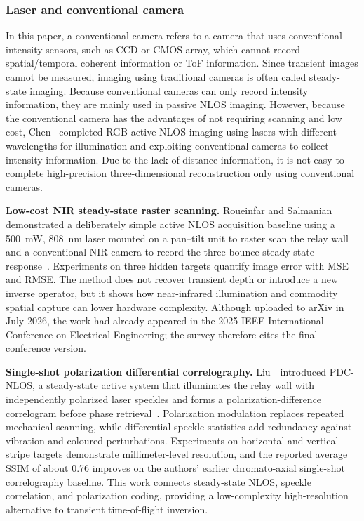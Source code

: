\subsubsection{Laser and conventional camera}
In this paper, a conventional camera refers to a camera that uses conventional intensity sensors, such as CCD or CMOS array, which cannot record spatial/temporal coherent information or ToF information. Since transient images cannot be measured, imaging using traditional cameras is often called steady-state imaging. Because conventional cameras can only record intensity information, they are mainly used in passive NLOS imaging. However, because the conventional camera has the advantages of not requiring scanning and low cost, Chen \etal~completed RGB active NLOS imaging using lasers with different wavelengths for illumination and exploiting conventional cameras to collect intensity information\cite{chenSteadystateNonLineofSightImaging2019}. Due to the lack of distance information, it is not easy to complete high-precision three-dimensional reconstruction only using conventional cameras.

\vspace{0.8mm}
\noindent \textbf{Low-cost NIR steady-state raster scanning.}
Roueinfar and Salmanian demonstrated a deliberately simple active NLOS acquisition baseline using a 500~mW, 808~nm laser mounted on a pan--tilt unit to raster scan the relay wall and a conventional NIR camera to record the three-bounce steady-state response~\cite{roueinfarNIRRaster2025}. Experiments on three hidden targets quantify image error with MSE and RMSE. The method does not recover transient depth or introduce a new inverse operator, but it shows how near-infrared illumination and commodity spatial capture can lower hardware complexity. Although uploaded to arXiv in July 2026, the work had already appeared in the 2025 IEEE International Conference on Electrical Engineering; the survey therefore cites the final conference version.

\vspace{0.8mm}
\noindent \textbf{Single-shot polarization differential correlography.}
Liu~\etal~introduced PDC-NLOS, a steady-state active system that illuminates the relay wall with independently polarized laser speckles and forms a polarization-difference correlogram before phase retrieval~\cite{liuPolarizationDifferentialCorrelography2025}. Polarization modulation replaces repeated mechanical scanning, while differential speckle statistics add redundancy against vibration and coloured perturbations. Experiments on horizontal and vertical stripe targets demonstrate millimeter-level resolution, and the reported average SSIM of about 0.76 improves on the authors' earlier chromato-axial single-shot correlography baseline. This work connects steady-state NLOS, speckle correlation, and polarization coding, providing a low-complexity high-resolution alternative to transient time-of-flight inversion.


